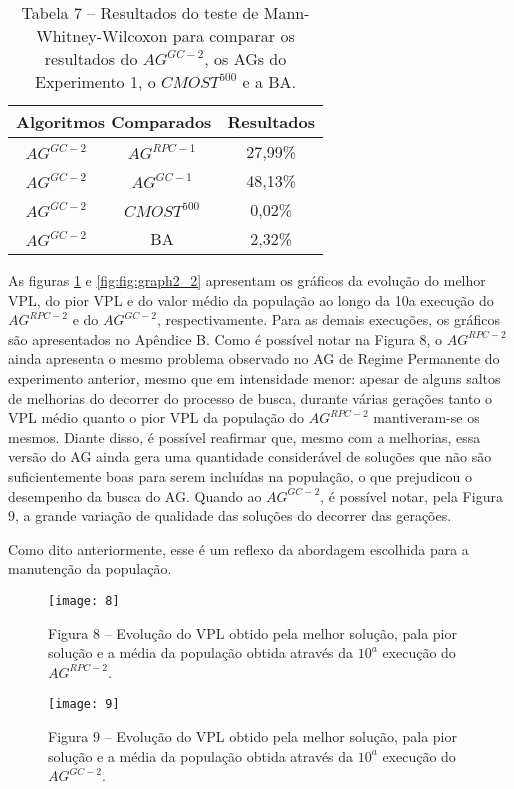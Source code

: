 \begin{table}[htb]
\centering
\caption{Tabela 7 – Resultados do teste de Mann-Whitney-Wilcoxon para comparar os resultados do $AG^{GC-2}$, os AGs do Experimento 1, o $CMOST^500$ e a BA.}
\label{tab:mw2_2}
\begin{tabular}{|c|c|c|}
\hline
\multicolumn{2}{|c|}{Algoritmos Comparados} & Resultados \\ \hline
$AG^{GC-2}$ & $AG^{RPC-1}$ & 27,99\% \\ \hline
$AG^{GC-2}$ & $AG^{GC-1}$ & 48,13\% \\ \hline
$AG^{GC-2}$ & $CMOST^500$ & 0,02\% \\ \hline
$AG^{GC-2}$ & BA & 2,32\% \\ \hline

\end{tabular}
\end{table}

As figuras \ref{fig:graph2_1} e \ref{fig:fig:graph2_2} apresentam os gráficos da evolução do melhor VPL, do pior VPL e do valor médio da população ao longo da 10a execução do $AG^{RPC-2}$ e do $AG^{GC-2}$, respectivamente. Para as demais execuções, os gráficos são apresentados no Apêndice B.  Como é possível notar na Figura 8, o $AG^{RPC-2}$ ainda apresenta o mesmo problema observado no AG de Regime Permanente do experimento anterior, mesmo que em intensidade menor: apesar de alguns saltos de melhorias do decorrer do processo de busca, durante várias gerações tanto o VPL médio quanto o pior VPL da população do $AG^{RPC-2}$ mantiveram-se os mesmos. Diante disso, é possível reafirmar que, mesmo com a melhorias, essa versão do AG ainda gera uma quantidade considerável de soluções que não são suficientemente boas para serem incluídas na população, o que prejudicou o desempenho da busca do AG. Quando ao $AG^{GC-2}$, é possível notar, pela Figura 9, a grande variação de qualidade das soluções do decorrer das gerações. 

Como dito anteriormente, esse é um reflexo da abordagem escolhida para a manutenção da população.

\begin{figure}[H]
\centering
\texttt{[image: 8]}
\caption{Figura 8 – Evolução do VPL obtido pela melhor solução, pala pior solução e a média da população obtida através da $10^a$ execução do $AG^{RPC-2}$.}
\label{fig:graph2_1}
\end{figure}

\begin{figure}[H]
\centering
\texttt{[image: 9]}
\label{fig:graph2_2}
\caption{Figura 9 – Evolução do VPL obtido pela melhor solução, pala pior solução e a média da população obtida através da $10^a$ execução do $AG^{GC-2}$.}

\end{figure}

